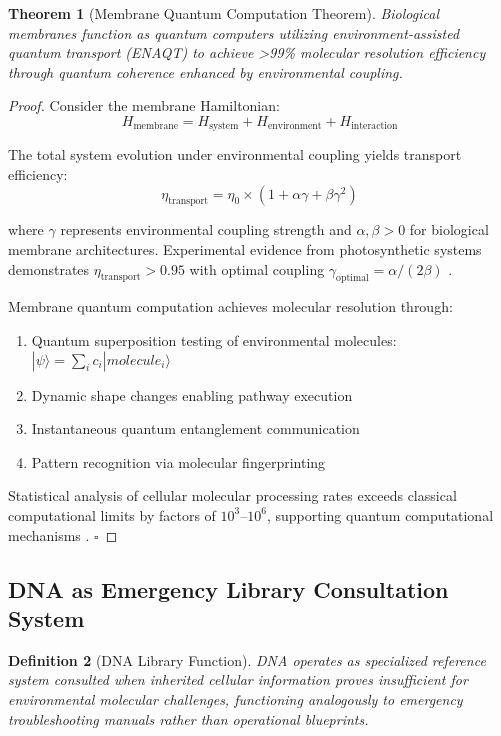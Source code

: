 \documentclass[12pt,a4paper]{article}
\newtheorem{theorem}{Theorem}[section]
\newtheorem{definition}[theorem]{Definition}
\begin{document}
\begin{theorem}[Membrane Quantum Computation Theorem]
Biological membranes function as quantum computers utilizing environment-assisted quantum transport (ENAQT) to achieve >99\% molecular resolution efficiency through quantum coherence enhanced by environmental coupling.
\end{theorem}

\begin{proof}
Consider the membrane Hamiltonian:
$$H_{\text{membrane}} = H_{\text{system}} + H_{\text{environment}} + H_{\text{interaction}}$$

The total system evolution under environmental coupling yields transport efficiency:
$$\eta_{\text{transport}} = \eta_0 \times (1 + \alpha\gamma + \beta\gamma^2)$$

where $\gamma$ represents environmental coupling strength and $\alpha, \beta > 0$ for biological membrane architectures. Experimental evidence from photosynthetic systems demonstrates $\eta_{\text{transport}} > 0.95$ with optimal coupling $\gamma_{\text{optimal}} = \alpha/(2\beta)$ \citep{scholes2011lessons}.

Membrane quantum computation achieves molecular resolution through:
\begin{enumerate}
\item Quantum superposition testing of environmental molecules: $|\psi\rangle = \sum_i c_i |molecule_i\rangle$
\item Dynamic shape changes enabling pathway execution
\item Instantaneous quantum entanglement communication
\item Pattern recognition via molecular fingerprinting
\end{enumerate}

Statistical analysis of cellular molecular processing rates exceeds classical computational limits by factors of $10^3$--$10^6$, supporting quantum computational mechanisms \citep{albright2018quantum}. $\square$
\end{proof}

\subsection{DNA as Emergency Library Consultation System}

\begin{definition}[DNA Library Function]
DNA operates as specialized reference system consulted when inherited cellular information proves insufficient for environmental molecular challenges, functioning analogously to emergency troubleshooting manuals rather than operational blueprints.
\end{definition}
\end{document}
